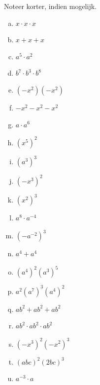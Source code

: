 \documentclass[12pt,twoside]{article}
\begin{document}
\begin{oefening}
Noteer korter, indien mogelijk.
\begin{multicols}{3}
  \begin{enumerate}[(a)]
    \itemsep1em
    \item $x\cdot x\cdot x$
    \item $x+x+x$
    \item $a^5\cdot a^2$
    \item $b^7\cdot b^3\cdot b^8$
    \item $\left(-x^2\right)\left(-x^2\right)$
    \item $-x^2-x^2-x^2$
    \item $a\cdot a^6$
    \item $\left(x^5\right)^2$
    \item $\left(a^3\right)^3$
    \item $\left(-x^3\right)^2$
    \item $\left(x^2\right)^3$
    \item $a^8\cdot a^{-4}$
    \item $\left(-a^{-2}\right)^3$
    \item $a^4+a^4$
    \item $\left(a^4\right)^2\left(a^3\right)^5$
    \item $a^2\left(a^7\right)^3\left(a^4\right)^2$
    \item $ab^2+ab^2+ab^2$
    \item $ab^2\cdot ab^2\cdot ab^2$
    \item $\left(-x^3\right)^2\left(-x^2\right)^3$
    \item $\left(abc\right)^2\left(2bc\right)^3$
    \item $a^{-3}\cdot a$
  \end{enumerate}
\end{multicols}
\end{oefening}
\end{document}

